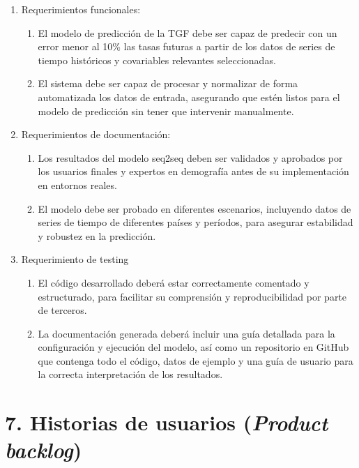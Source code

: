 \documentclass[
11pt, %
]{charter}
\begin{document}
\begin{enumerate}
	\item Requerimientos funcionales:
		\begin{enumerate}
				\item El modelo de predicción de la TGF debe ser capaz de predecir con un error menor al 10\% las tasas futuras a partir de los datos de series de tiempo históricos y covariables relevantes seleccionadas.
				\item El sistema debe ser capaz de procesar y normalizar de forma automatizada los datos de entrada, asegurando que estén listos para el modelo de predicción sin tener que  intervenir manualmente.
			\end{enumerate}
	\item Requerimientos de documentación:
		\begin{enumerate}
				\item Los resultados del modelo seq2seq deben ser validados y aprobados por los usuarios finales y  expertos en demografía antes de su implementación en entornos reales.
				\item El modelo debe ser probado en diferentes escenarios, incluyendo datos de series de tiempo de diferentes países y períodos, para asegurar estabilidad y robustez en la predicción.
			\end{enumerate}
	\item Requerimiento de testing
		\begin{enumerate}
			\item El código desarrollado deberá estar correctamente comentado y estructurado, para facilitar su comprensión y reproducibilidad por parte de terceros.
			\item La documentación generada deberá incluir una guía detallada para la configuración y ejecución del modelo, así como un repositorio en GitHub que contenga todo el código, datos de ejemplo y una guía de usuario para la correcta interpretación de los resultados.
		\end{enumerate}

\end{enumerate}

\section{7. Historias de usuarios (\textit{Product backlog})}
\label{sec:backlog}
\end{document}
